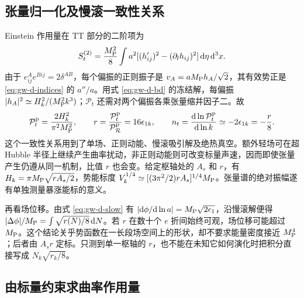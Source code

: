 \subsection{张量归一化及慢滚一致性关系}

Einstein 作用量在 TT 部分的二阶项为
\[
 S_t^{(2)}=\frac{M_{\rm P}^2}{8}\int a^2
  [(h_{ij}')^2-(\partial_lh_{ij})^2]\,\mathrm d\eta\,\mathrm d^3x .
\]
由于 $e^A_{ij}e^{Bij}=2\delta^{AB}$，每个偏振的正则振子是 $v_A=aM_{\rm P}h_A/\sqrt2$，其有效势正是 \eqref{eq:gw-d-indices} 的 $a''/a$。用式 \eqref{eq:gw-d-bd} 的冻结解，每偏振 $|h_A|^2\simeq H_k^2/(M_{\rm P}^2 k^3)$；$\mathcal P_t$ 还需对两个偏振各乘张量缩并因子二。故
\begin{equation}\label{eq:gw-d-r}
 \mathcal P_t^{\rm p}=\frac{2H_k^2}{\pi^2M_{\rm P}^2},\qquad
 r=\frac{\mathcal P_t^{\rm p}}{\mathcal P_{\mathcal R}^{\rm p}}=16\epsilon_{1k},
 \qquad n_t=\frac{\mathrm d\ln\mathcal P_t^{\rm p}}{\mathrm d\ln k}
 \simeq -2\epsilon_{1k}=-\frac r8 .
\end{equation}
这个一致性关系用到了单场、正则动能、慢滚吸引解及绝热真空。额外轻场可在超 Hubble 半径上继续产生曲率扰动，非正则动能则可改变标量声速，因而即使张量产生仍遵从同一机制，比值 $r$ 也会变。给定枢轴处的 $A_s$ 和 $r$，有 $H_k=\pi M_{\rm P}\sqrt{rA_s/2}$，势能标度 $V_k^{1/4}\simeq[(3\pi^2/2)r A_s]^{1/4}M_{\rm P}$。张量谱的绝对振幅遂有单独测量暴涨能标的意义。

再看场位移。由式 \eqref{eq:gw-d-slow} 有 $|\mathrm d\phi/\mathrm d\ln a|=M_{\rm P}\sqrt{2\epsilon_1}$，沿慢滚解便得 $|\Delta\phi|/M_{\rm P}=\int\sqrt{r(N)/8}\,\mathrm dN$。若 $r$ 在数十个 $e$ 折间始终可观，场位移可能超过 $M_{\rm P}$。这个结论关乎势函数在一长段场空间上的形状，却不要求能量密度接近 $M_{\rm P}^4$；后者由 $A_sr$ 定标。只测到单一枢轴的 $r$，也不能在未知它如何演化时把积分直接写成 $N_k\sqrt{r_k/8}$。


\subsection{由标量约束求曲率作用量}

